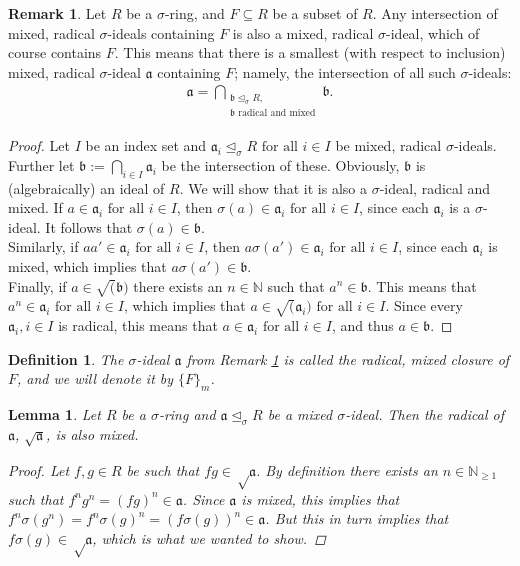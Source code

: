 \documentclass{article}
\def\NE{\mathbb{N}_{\geq1}}
\def\N{\mathbb{N}}
\def\a{\mathfrak{a}}
\def\b{\mathfrak{b}}
\def\s{\sigma}
\def\si{\unlhd_{\sigma}}
\def\fa{\text{ for all }}
\newenvironment{bew}{\begin{proof}[Proof]}{\end{proof}}
\theoremstyle{plain}
\newtheorem{lem}[Satz]{Lemma}
\newtheorem{defn}[Satz]{Definition}
\theoremstyle{definition}
\newtheorem{rem}[Satz]{Remark}
\begin{document}
\begin{rem}\label{wmwelldef}
Let $R$ be a $\s$-ring, and $F \subseteq R$ be a subset of $R$. Any intersection of mixed, radical $\s$-ideals containing $F$ is also a mixed, radical $\s$-ideal, which of course contains $F$. 
This means that there is a smallest (with respect to inclusion) mixed, radical $\s$-ideal $\a$ containing $F$; namely, the intersection of all such $\s$-ideals:
\begin{align*} \a = \bigcap_{\substack{ \b \si R, \\ \b \text{ radical and mixed}}} \b. \end{align*}
\begin{proof}
Let $I$ be an index set and $\a_i \si R \fa i \in I$ be mixed, radical $\s$-ideals. Further let $\b := \bigcap_{i \in I} \a_i$ be the intersection of these. Obviously, $\b$ is (algebraically) an ideal of $R$. We will show that it is also a $\s$-ideal, radical and mixed.
If $a \in \a_i \fa i \in I$, then $\s(a) \in \a_i \fa i \in I$, since each $\a_i$ is a $\s$-ideal.
It follows that $\s(a) \in \b$. \\
\indent Similarly, if $aa' \in \a_i \fa i \in I$, then $a \s(a') \in \a_i \fa i \in I$, since each $\a_i$ is mixed, which implies that $a \s(a') \in \b$.  \\
\indent Finally, if $a \in \sqrt(\b)$ there exists an $n \in \N$ such that $a^n \in \b$. This means that $a^n \in \a_i \fa i \in I$, which implies that $a \in \sqrt(\a_i) \fa i \in I$. Since every $\a_i, i \in I$ is radical, this means that $a \in \a_i \fa i \in I$,
and thus $a \in \b$.
\end{proof}
\end{rem}

\begin{defn}
The $\s$-ideal $\a$ from Remark \ref{wmwelldef} is called the radical, mixed closure of $F$, and we will denote it by $\{F\}_{m}$.
\end{defn}


\begin{lem}\label{sqrtmixed}
Let $R$ be a $\s$-ring and $\a \si R$ be a mixed $\s$-ideal. Then the radical of $\a$, $\sqrt{\a}$, is also mixed.
\begin{bew}
Let $f,g \in R$ be such that $fg \in \sqrt \a$. By definition there exists an $n \in \NE$ such that $f^n g^n = (fg)^n \in \a$. Since $\a$ is mixed, this implies that $f^n \s(g^n) = f^n \s(g)^n = (f\s(g))^n \in \a$. 
But this in turn implies that $f\s(g) \in \sqrt \a$, which is what we wanted to show.
\end{bew}
\end{lem}
\end{document}

